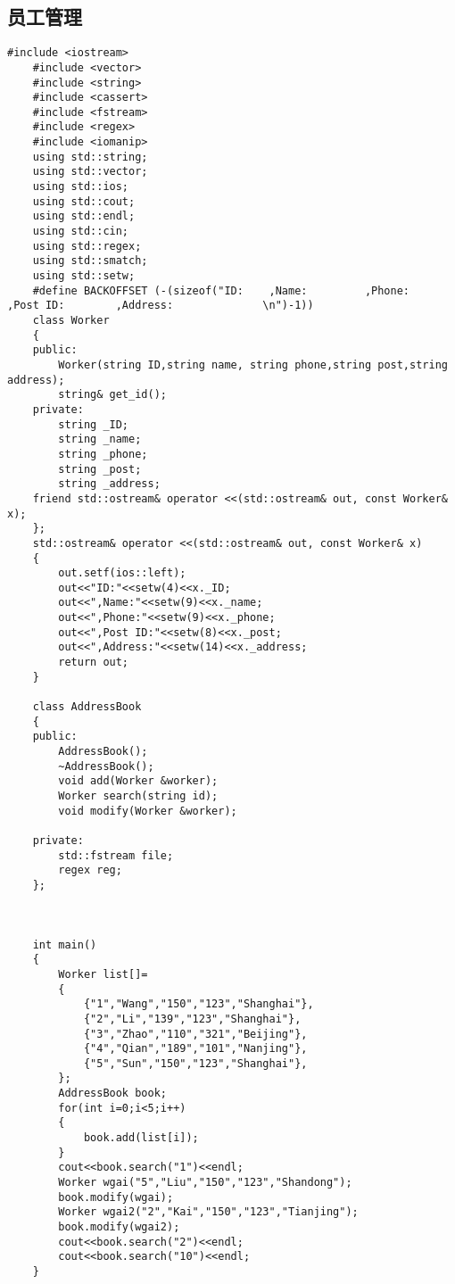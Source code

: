 \documentclass[UTF8]{ctexart}
\begin{document}
\subsection{员工管理}
\begin{lstlisting}[language={[ANSI]C++}]
    #include <iostream>
    #include <vector>
    #include <string>
    #include <cassert>
    #include <fstream>
    #include <regex>
    #include <iomanip>
    using std::string;
    using std::vector;
    using std::ios;
    using std::cout;
    using std::endl;
    using std::cin;
    using std::regex;
    using std::smatch;
    using std::setw;
    #define BACKOFFSET (-(sizeof("ID:    ,Name:         ,Phone:         ,Post ID:        ,Address:              \n")-1))
    class Worker
    {
    public:
        Worker(string ID,string name, string phone,string post,string address);
        string& get_id();
    private:
        string _ID;
        string _name;
        string _phone;
        string _post;
        string _address;
    friend std::ostream& operator <<(std::ostream& out, const Worker& x);
    };
    std::ostream& operator <<(std::ostream& out, const Worker& x)
    {
        out.setf(ios::left);
        out<<"ID:"<<setw(4)<<x._ID;
        out<<",Name:"<<setw(9)<<x._name;
        out<<",Phone:"<<setw(9)<<x._phone;
        out<<",Post ID:"<<setw(8)<<x._post;
        out<<",Address:"<<setw(14)<<x._address;
        return out;
    }
    
    class AddressBook
    {
    public:
        AddressBook();
        ~AddressBook();
        void add(Worker &worker);
        Worker search(string id);
        void modify(Worker &worker);
    
    private:
        std::fstream file;
        regex reg;
    };
    
    
    
    int main()
    {
        Worker list[]=
        {
            {"1","Wang","150","123","Shanghai"},
            {"2","Li","139","123","Shanghai"},
            {"3","Zhao","110","321","Beijing"},
            {"4","Qian","189","101","Nanjing"},
            {"5","Sun","150","123","Shanghai"},                   
        };
        AddressBook book;
        for(int i=0;i<5;i++)
        {
            book.add(list[i]);
        }
        cout<<book.search("1")<<endl;
        Worker wgai("5","Liu","150","123","Shandong");
        book.modify(wgai);
        Worker wgai2("2","Kai","150","123","Tianjing");
        book.modify(wgai2);
        cout<<book.search("2")<<endl;
        cout<<book.search("10")<<endl;
    }
    

\end{lstlisting}
\end{document}
